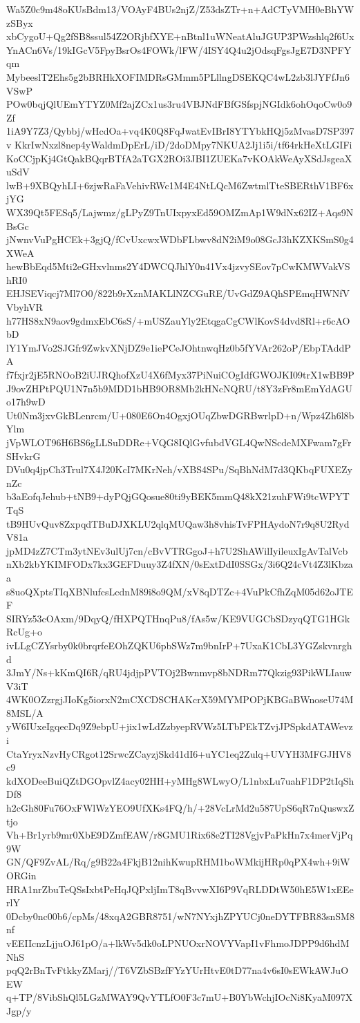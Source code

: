Wa5Z0c9m48oKUsBdm13/VOAyF4BUs2njZ/Z53dsZTr+n+AdCTyVMH0eBhYWzSByx
xbCygoU+Qg2fSB8ssul54Z2ORjbfXYE+nBtnl1uWNeatAluJGUP3PWzshlq2f6Ux
YnACn6Vs/19kIGcV5FpyBsrOs4FOWk/lFW/4ISY4Q4u2jOdsqFgsJgE7D3NPFYqm
MybeeslT2Ehs5g2bBRHkXOFIMDRsGMmm5PLllngDSEKQC4wL2zb3lJYFfJn6VSwP
POw0bqjQlUEmYTYZ0Mf2ajZCx1us3ru4VBJNdFBfGSfspjNGIdk6ohOqoCw0o9Zf
1iA9Y7Z3/Qybbj/wHcdOa+vq4K0Q8FqJwatEvIBrI8YTYbkHQj5zMvasD7SP397v
KkrIwNxzl8nep4yWaldmDpErL/iD/2doDMpy7NKUA2Jj1i5i/tf64rkHeXtLGIFi
KoCCjpKj4GtQakBQqrBTfA2aTGX2ROi3JBI1ZUEKa7vKOAkWeAyXSdJsgeaXuSdV
lwB+9XBQyhLI+6zjwRaFaVehivRWc1M4E4NtLQcM6ZwtmlTteSBERthV1BF6xjYG
WX39Qt5FESq5/Lajwmz/gLPyZ9TnUIxpyxEd59OMZmAp1W9dNx62IZ+Aqs9NBsGc
jNwnvVuPgHCEk+3gjQ/fCvUxcwxWDbFLbwv8dN2iM9o08GcJ3hKZXKSmS0g4XWeA
hewBbEqd5Mti2eGHxvlnms2Y4DWCQJhlY0n41Vx4jzvySEov7pCwKMWVakVShRI0
EHJSEViqcj7Ml7O0/822b9rXznMAKLlNZCGuRE/UvGdZ9AQhSPEmqHWNfVVbyhVR
h77HS8xN9aov9gdmxEbC6sS/+mUSZauYly2EtqgaCgCWlKovS4dvd8Rl+r6cAObD
lY1YmJVo2SJGfr9ZwkvXNjDZ9e1iePCeJOhtnwqHz0b5fYVAr262oP/EbpTAddPA
f7fxjr2jE5RNOoB2iUJRQhofXzU4X6fMyx37PiNuiCOgIdfGWOJKI09trX1wBB9P
J9ovZHPtPQU1N7n5b9MDD1bHB9OR8Mb2kHNcNQRU/t8Y3zFr8mEmYdAGUo17h9wD
Ut0Nm3jxvGkBLenrcm/U+080E6On4OgxjOUqZbwDGRBwrlpD+n/Wpz4Zh6l8bYlm
jVpWLOT96H6BS6gLLSuDDRe+VQG8IQlGvfubdVGL4QwNScdeMXFwam7gFrSHvkrG
DVu0q4jpCh3Trul7X4J20KcI7MKrNeh/vXBS4SPu/SqBhNdM7d3QKbqFUXEZynZc
b3aEofqJehub+tNB9+dyPQjGQosue80ti9yBEK5mmQ48kX21zuhFWi9tcWPYTTqS
tB9HUvQuv8ZxpqdTBuDJXKLU2qlqMUQaw3h8vhisTvFPHAydoN7r9q8U2RydV81a
jpMD4zZ7CTm3ytNEv3ulUj7cn/cBvVTRGgoJ+h7U2ShAWilIyileuxIgAvTalVcb
nXb2kbYKIMFODx7kx3GEFDuuy3Z4fXN/0sExtDdI0SSGx/3i6Q24cVt4Z3lKbzaa
s8uoQXptsTIqXBNlufcsLcdnM89i8o9QM/xV8qDTZc+4VuPkCfhZqM05d62oJTEF
SIRYz53cOAxm/9DqyQ/fHXPQTHnqPu8/fAs5w/KE9VUGCbSDzyqQTG1HGkRcUg+o
ivLLgCZYsrby0k0brqrfeEOhZQKU6pbSWz7m9bnIrP+7UxaK1CbL3YGZskvnrghd
3JmY/Ns+kKmQI6R/qRU4jdjpPVTOj2Bwnmvp8bNDRm77Qkzig93PikWLIauwV3iT
4WK0OZzrgjJIoKg5iorxN2mCXCDSCHAKcrX59MYMPOPjKBGaBWnoseU74M8MSL/A
yW6IUxeIgqecDq9Z9ebpU+jix1wLdZzbyepRVWz5LTbPEkTZvjJPSpkdATAWevzi
CtaYryxNzvHyCRgot12SrwcZCayzjSkd41dI6+uYC1eq2Zulq+UVYH3MFGJHV8c9
kdXODeeBuiQZtDGOpvlZ4acy02HH+yMHg8WLwyO/L1nbxLu7uahF1DP2tIqShDf8
h2cGh80Fu76OxFWlWzYEO9UfXKs4FQ/h/+28VcLrMd2u587UpS6qR7nQuswxZtjo
Vh+Br1yrb9mr0XbE9DZmfEAW/r8GMU1Rix68e2TI28VgjvPaPkHn7x4merVjPq9W
GN/QF9ZvAL/Rq/g9B22a4FkjB12nihKwupRHM1boWMkijHRp0qPX4wh+9iWORGin
HRA1nrZbuTeQSsIxbtPeHqJQPxljImT8qBvvwXI6P9VqRLDDtW50hE5W1xEEerlY
0Dcby0nc00b6/cpMs/48xqA2GBR8751/wN7NYxjhZPYUCj0neDYTFBR83snSM8nf
vEEIIcnzLjjuOJ61pO/a+lkWv5dk0oLPNUOxrNOVYVapI1vFhmoJDPP9d6hdMNhS
pqQ2rBnTvFtkkyZMarj//T6VZbSBzfFYzYUrHtvE0tD77na4v6sI0sEWkAWJuOEW
q+TP/8VibShQl5LGzMWAY9QvYTLfO0F3c7mU+B0YbWchjIOcNi8KyaM097XJgp/y
